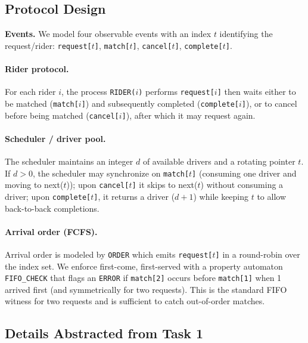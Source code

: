 \documentclass[11pt]{article}
\begin{document}
\subsection{Protocol Design}

\textbf{Events.} We model four observable events with an index $t$ identifying the request/rider:
\texttt{request[$t$]}, \texttt{match[$t$]}, \texttt{cancel[$t$]}, \texttt{complete[$t$]}.

\paragraph{Rider protocol.}
For each rider $i$, the process \texttt{RIDER($i$)} performs \texttt{request[$i$]} then waits
either to be matched (\texttt{match[$i$]}) and subsequently completed (\texttt{complete[$i$]}),
or to cancel before being matched (\texttt{cancel[$i$]}), after which it may request again.

\paragraph{Scheduler / driver pool.}
The scheduler maintains an integer $d$ of available drivers and a rotating pointer $t$.
If $d>0$, the scheduler may synchronize on \texttt{match[$t$]} (consuming one driver and moving to next($t$));
upon \texttt{cancel[$t$]} it skips to next($t$) without consuming a driver; upon \texttt{complete[$t$]},
it returns a driver ($d{+}1$) while keeping $t$ to allow back-to-back completions.

\paragraph{Arrival order (FCFS).}
Arrival order is modeled by \texttt{ORDER} which emits \texttt{request[$t$]} in a round-robin over the index set.
We enforce first-come, first-served with a property automaton \texttt{FIFO\_CHECK} that flags an \texttt{ERROR}
if \texttt{match[2]} occurs before \texttt{match[1]} when 1 arrived first (and symmetrically for two requests).
This is the standard FIFO witness for two requests and is sufficient to catch out-of-order matches.

\subsection{Details Abstracted from Task 1}
\end{document}
